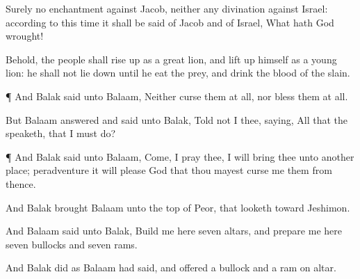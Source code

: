 {Surely
{} no
enchantment against
Jacob, neither
{} any
divination against
Israel: according to this
time it shall be
said of
Jacob and of
Israel, What hath
God
wrought!

Behold, the
people shall rise
up as a great
lion, and lift
up himself as a young
lion: he shall not lie
down until he
eat
{} the
prey, and
drink the
blood of the
slain.


\par }{\PP {}¶ And
Balak
said unto
Balaam, Neither
curse them at
all, nor
bless them at
all.

But
Balaam
answered and
said unto
Balak,
Told not I thee,
saying, All that the
{}
speaketh, that I must
do?


\par }{\PP {}¶ And
Balak
said unto
Balaam,
Come, I pray thee, I will
bring thee unto
another
place; peradventure it will
please
God that thou mayest
curse me them from thence.

And
Balak
brought
Balaam unto the
top of
Peor, that
looketh
toward
Jeshimon.

And
Balaam
said unto
Balak,
Build me here
seven
altars, and
prepare me here
seven
bullocks and
seven
rams.

And
Balak
did as
Balaam had
said, and
offered a
bullock and a
ram on
{}
altar.




\par }
